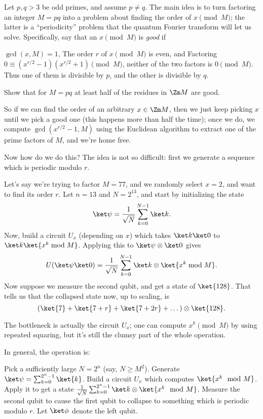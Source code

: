 Let $p,q > 3$ be odd primes, and assume $p \neq q$.
The main idea is to turn factoring an integer $M = pq$ into a problem
about finding the order of $x \pmod M$; the latter is a ``periodicity''
problem that the quantum Fourier transform will let us solve.
Specifically, say that an $x \pmod M$ is \emph{good} if
\begin{enumerate}[(i)]
	\ii $\gcd(x,M) = 1$,
	\ii The order $r$ of $x \pmod M$ is even, and
	\ii Factoring $0 \equiv (x^{r/2}-1)(x^{r/2}+1) \pmod M$,
	neither of the two factors is $0 \pmod M$.
	Thus one of them is divisible by $p$, and the other
	is divisible by $q$.
\end{enumerate}
\begin{exercise}
	Show that for $M = pq$ at least half of the residues
	in $\Zm M$ are good.
\end{exercise}

So if we can find the order of an arbitrary $x \in \Zm M$,
then we just keep picking $x$ until we pick a good one
(this happens more than half the time);
once we do, we compute $\gcd(x^{r/2}-1,M)$ using the Euclidean
algorithm to extract one of the prime factors of $M$, and we're home free.

Now how do we do this?  The idea is not so difficult:
first we generate a sequence which is periodic modulo $r$.
\begin{example}
	Let's say we're trying to factor $M = 77$,
	and we randomly select $x = 2$, and want to find its order $r$.
	Let $n = 13$ and $N = 2^{13}$, and start by initializing the state
	\[ \ket\psi = \frac{1}{\sqrt N} \sum_{k=0}^{N-1} \ket k. \]
	Now, build a circuit $U_x$ (depending on $x$)
	which takes $\ket k \ket 0$ to $\ket k \ket{x^k \bmod M}$.
	Applying this to $\ket\psi \otimes \ket0$ gives
	\[ U(\ket\psi\ket0) =
		\frac{1}{\sqrt N} \sum_{k=0}^{N-1} \ket k \otimes \ket{x^k \bmod M}. \]
	Now suppose we measure the second qubit, and get a state of $\ket{128}$.
	That tells us that the collapsed state now, up to scaling, is
	\[ (\ket{7} + \ket{7+r} + \ket{7+2r} + \dots) \otimes \ket{128}. \]
\end{example}
The bottleneck is actually the circuit $U_x$;
one can compute $x^k \pmod M$ by using repeated squaring,
but it's still the clumsy part of the whole operation.

In general, the operation is:
\begin{itemize}
	\ii Pick a sufficiently large $N = 2^n$ (say, $N \ge M^2$).
	\ii Generate $\ket\psi = \sum_{k=0}^{2^n-1} \ket{k}$.
	\ii Build a circuit $U_x$ which computes $\ket{x^k \mod M}$.
	\ii Apply it to get a state
	$\frac{1}{\sqrt N} \sum_{k=0}^{2^n-1} \ket k \otimes \ket{x^k \mod M}$.
	\ii Measure the second qubit to cause the first qubit to
	collapse to something which is periodic modulo $r$.
	Let $\ket\phi$ denote the left qubit.
\end{itemize}

